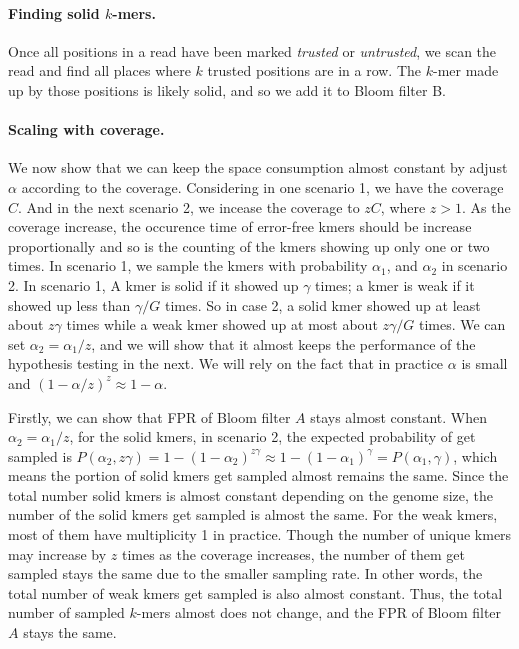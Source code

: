\documentclass[10pt]{article}
\begin{document}
\paragraph{Finding solid $k$-mers.}  Once all positions in a read have been marked \emph{trusted} or \emph{untrusted}, we scan the read and find all places where $k$ trusted positions are in a row.  The $k$-mer made up by those positions is likely solid, and so we add it to Bloom filter B.  


\paragraph{Scaling with coverage.}  We now show that we can keep the space consumption almost constant by adjust $\alpha$ according to the coverage. Considering in one scenario 1, we have the coverage $C$. And in the next scenario 2, we incease the coverage to $zC$, where $z>1$. As the coverage increase, the occurence time of error-free kmers should be increase proportionally and so is the counting of the kmers showing up only one or two times. In scenario 1, we sample the kmers with probability $\alpha_1$, and $\alpha_2$ in scenario 2. In scenario 1, A kmer is solid if it showed up $\gamma$ times; a kmer is weak if it showed up less than $\gamma/G$ times. So in case 2, a solid kmer showed up at least about $z\gamma$ times while a weak kmer showed up at most about $z\gamma/G$ times. We can set $\alpha_2=\alpha_1/z$, and we will show that it almost keeps the performance of the hypothesis testing in the next. We will rely on the fact that in practice $\alpha$ is small and $(1-\alpha/z)^z\approx 1-\alpha$.

Firstly, we can show that FPR of Bloom filter $A$ stays almost constant. When $\alpha_2=\alpha_1/z$, for the solid kmers, in scenario 2, the expected probability of get sampled is $P(\alpha_2,z\gamma)=1-(1-\alpha_2)^{z\gamma}\approx 1-(1-\alpha_1)^\gamma = P(\alpha_1,\gamma)$, which means the portion of solid kmers get sampled almost remains the same. Since the total number solid kmers is almost constant depending on the genome size, the number of the solid kmers get sampled is almost the same. For the weak kmers, most of them have multiplicity 1 in practice. Though the number of unique kmers may increase by $z$ times as the coverage increases, the number of them get sampled stays the same due to the smaller sampling rate. In other words, the total number of weak kmers get sampled is also almost constant. Thus, the total number of sampled $k$-mers almost does not change, and the FPR of Bloom filter $A$ stays the same.
\end{document}
